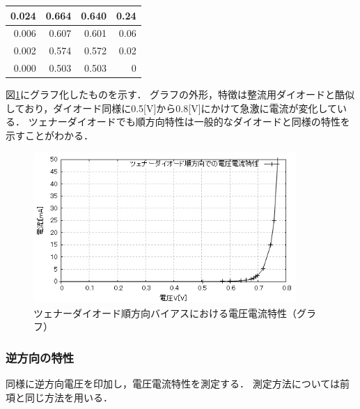 \documentclass[titlepage]{jarticle}
\begin{document}
\begin{table}[htbp]
\begin{center}
\begin{tabular}{r|r|r|r}
            0.024                                    & 0.664                           & 0.640                                             & 0.24                         \\ \hline
            0.006                                    & 0.607                           & 0.601                                             & 0.06                         \\ \hline
            0.002                                    & 0.574                           & 0.572                                             & 0.02                         \\ \hline
            0.000                                    & 0.503                           & 0.503                                             & 0                            \\ \hline
        \end{tabular}
    \end{center}
    \label{ツェナーダイオード順方向バイアスにおける電圧電流特性測定結果}
\end{table}

図\ref{fig:ツェナーダイオード順方向バイアスにおける電圧電流特性（グラフ）}にグラフ化したものを示す．
グラフの外形，特徴は整流用ダイオードと酷似しており，ダイオード同様に0.5[V]から0.8[V]にかけて急激に電流が変化している．
ツェナーダイオードでも順方向特性は一般的なダイオードと同様の特性を示すことがわかる．

\begin{figure}[H]
    \begin{center}
        \includegraphics[width=10cm]{graph/3.png}
        \caption{ツェナーダイオード順方向バイアスにおける電圧電流特性（グラフ）}
        \label{fig:ツェナーダイオード順方向バイアスにおける電圧電流特性（グラフ）}
    \end{center}
\end{figure}

\subsubsection{逆方向の特性}
同様に逆方向電圧を印加し，電圧電流特性を測定する．
測定方法については前項と同じ方法を用いる．
\end{document}
